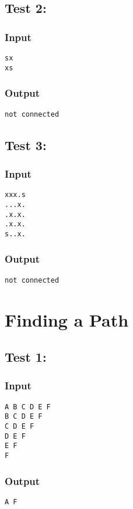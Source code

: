 \documentclass[9pt]{extarticle}
\begin{document}
\begin{multicols}{2}
\subsection*{Test 2:}
\subsubsection*{Input}
\texttt{sx\\
xs}

\subsubsection*{Output}
\texttt{not connected}

\subsection*{Test 3:}
\subsubsection*{Input}
\texttt{xxx.s\\
...x.\\
.x.x.\\
.x.x.\\
s..x.}

\subsubsection*{Output}
\texttt{not connected}

\section{Finding a Path}
\subsection*{Test 1:}
\subsubsection*{Input}
\texttt{A B C D E F\\
B C D E F\\
C D E F\\
D E F\\
E F\\
F}

\subsubsection*{Output}
\texttt{A F}


\end{multicols}
\end{document}
